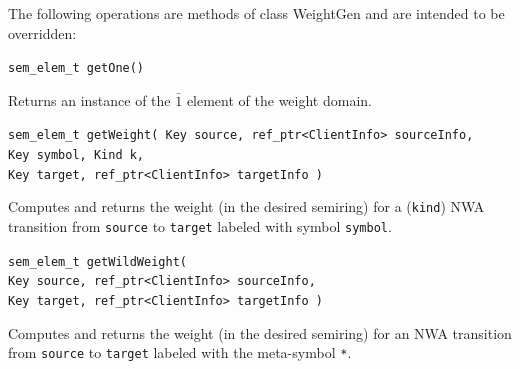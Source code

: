 \documentclass{llncs}
\begin{document}
\noindent The following operations are methods of class WeightGen and are intended to be overridden:

\begin{description} 

  \item \texttt{sem\_elem\_t getOne()}  \nopagebreak

    Returns an instance of the $\bar{1}$ element of the weight domain.

  \item \texttt{sem\_elem\_t getWeight( Key source, ref\_ptr<ClientInfo> sourceInfo, \\  
                              \hspace*{3.25cm} Key symbol, Kind k, \\
                              \hspace*{3.25cm} Key target, ref\_ptr<ClientInfo> targetInfo )}  \nopagebreak

    Computes and returns the weight (in the desired semiring) for a (\texttt{kind}) NWA transition from \texttt{source} to \texttt{target} labeled with symbol \texttt{symbol}.

  \item \texttt{sem\_elem\_t getWildWeight( \\
                              \hspace*{3.25cm} Key source, ref\_ptr<ClientInfo> sourceInfo, \\
                              \hspace*{3.25cm} Key target, ref\_ptr<ClientInfo> targetInfo )}  \nopagebreak

    Computes and returns the weight (in the desired semiring) for an NWA transition from \texttt{source} to \texttt{target} labeled with the meta-symbol \texttt{*}. \\

\end{description}
\end{document}
